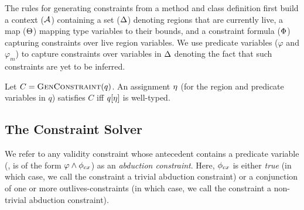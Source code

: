 The rules for generating constraints from a method and
class definition first build a context (${\mathcal{A}}$) containing a set ($ \Delta$) denoting
regions that are currently live, a map ($\Theta$) mapping type
variables to their bounds, and a constraint formula ($\Phi$)
capturing constraints over live region variables. We use predicate
variables ($\varphi$ and $\varphi_m$) to capture constraints over
variables in $\Delta$ denoting the fact that such constraints are yet
to be inferred.

%

\begin{theorem}
\label{thm:constraint-generation-sc}
Let $C = \textsc{GenConstraint}(q)$.
An assignment $\eta$ (for the region and predicate variables in $q$)
satisfies $C$ iff $q[\eta]$ is well-typed.
\end{theorem}

\subsection{The Constraint Solver}

We refer to any validity constraint whose antecedent contains a predicate variable
(\ie, is of the form $\varphi \wedge \phi_{cx}$) as an \emph{abduction constraint}.
Here,  $\phi_{cx}$ is either \emph{true} (in which case, we call the constraint a trivial
abduction constraint) or a conjunction of one or more outlives-constraints (in
which case, we call the constraint a non-trivial abduction constraint).

